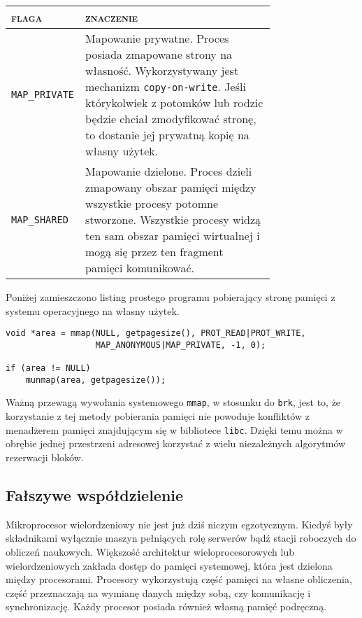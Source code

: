 \documentclass[12pt,a4paper,titlepage,twoside]{mwart}
\begin{document}
\begin{center}
\begin{tabular}{|l|p{0.75\linewidth}|}
\hline
\textsc{flaga} & \textsc{znaczenie} \\
\hline
\verb+MAP_PRIVATE+ & Mapowanie prywatne. Proces posiada zmapowane strony na
własność. Wykorzystywany jest mechanizm \texttt{copy-on-write}. Jeśli
którykolwiek z potomków lub rodzic będzie chciał zmodyfikować stronę, to
dostanie jej prywatną kopię na własny użytek. \\
\hline
\verb+MAP_SHARED+  & Mapowanie dzielone. Proces dzieli zmapowany obszar pamięci
między wszystkie procesy potomne stworzone. Wszystkie procesy widzą ten sam
obszar pamięci wirtualnej i mogą się przez ten fragment pamięci komunikować. \\
\hline
\end{tabular}
\end{center}

Poniżej zamieszczono listing prostego programu pobierający stronę pamięci z
systemu operacyjnego na własny użytek.

\vspace{2ex}
\begin{lstlisting}[caption={Przykład pobrania i zwolnienia jednej strony.},xleftmargin=3ex,xrightmargin=3ex]
void *area = mmap(NULL, getpagesize(), PROT_READ|PROT_WRITE,
                  MAP_ANONYMOUS|MAP_PRIVATE, -1, 0);

if (area != NULL)
    munmap(area, getpagesize());
\end{lstlisting}

Ważną przewagą wywołania systemowego \texttt{mmap}, w stosunku do \texttt{brk},
jest to, że korzystanie z tej metody pobierania pamięci nie powoduje konfliktów z
menadżerem pamięci znajdującym się w bibliotece \texttt{libc}. Dzięki temu
można w obrębie jednej przestrzeni adresowej korzystać z wielu niezależnych
algorytmów rezerwacji bloków.

\subsection{Fałszywe współdzielenie}

Mikroprocesor wielordzeniowy nie jest już dziś niczym egzotycznym. Kiedyś były
składnikami wyłącznie maszyn pełniących rolę serwerów bądź stacji roboczych do
obliczeń naukowych. Większość architektur wieloprocesorowych lub
wielordzeniowych zakłada dostęp do pamięci systemowej, która jest dzielona
między procesorami. Procesory wykorzystują część pamięci na własne obliczenia,
część przeznaczają na wymianę danych między sobą, czy komunikację i synchronizację.
Każdy procesor posiada również własną pamięć podręczną.
\end{document}
